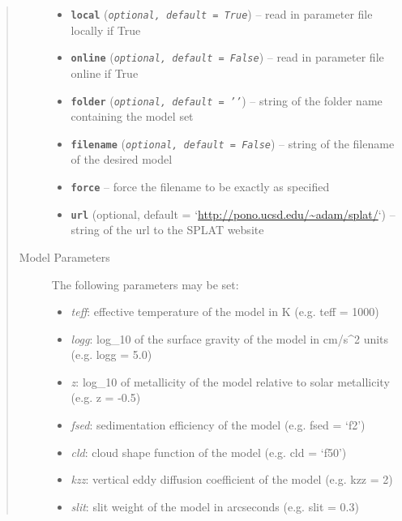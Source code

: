 \documentclass[letterpaper,10pt,english]{sphinxmanual}
\begin{document}
\begin{fulllineitems}
\begin{quote}
\begin{description}
\begin{itemize}
\item {} 
\textbf{\texttt{local}} (\emph{\texttt{optional, default = True}}) -- read in parameter file locally if True

\item {} 
\textbf{\texttt{online}} (\emph{\texttt{optional, default = False}}) -- read in parameter file online if True

\item {} 
\textbf{\texttt{folder}} (\emph{\texttt{optional, default = '{'}}}) -- string of the folder name containing the model set

\item {} 
\textbf{\texttt{filename}} (\emph{\texttt{optional, default = False}}) -- string of the filename of the desired model

\item {} 
\textbf{\texttt{force}} -- force the filename to be exactly as specified

\item {} 
\textbf{\texttt{url}} (optional, default = `\url{http://pono.ucsd.edu/~adam/splat/}`) -- string of the url to the SPLAT website

\end{itemize}

\item[{Model Parameters}] \leavevmode
The following parameters may be set:
\begin{itemize}
\item {} 
\emph{teff}: effective temperature of the model in K (e.g. teff = 1000)

\item {} 
\emph{logg}: log\_10 of the surface gravity of the model in cm/s\textasciicircum{}2 units (e.g. logg = 5.0)

\item {} 
\emph{z}: log\_10 of metallicity of the model relative to solar metallicity (e.g. z = -0.5)

\item {} 
\emph{fsed}: sedimentation efficiency of the model (e.g. fsed = `f2')

\item {} 
\emph{cld}: cloud shape function of the model (e.g. cld = `f50')

\item {} 
\emph{kzz}: vertical eddy diffusion coefficient of the model (e.g. kzz = 2)

\item {} 
\emph{slit}: slit weight of the model in arcseconds (e.g. slit = 0.3)


\end{itemize}
\end{description}
\end{quote}
\end{fulllineitems}
\end{document}

